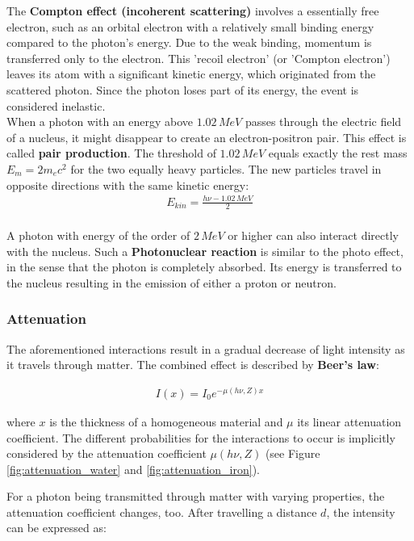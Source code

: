 The \textbf{Compton effect (incoherent scattering)} involves a essentially free electron, such as an orbital electron with a relatively small binding energy compared to the photon's energy.
Due to the weak binding, momentum is transferred only to the electron.
This 'recoil electron' (or 'Compton electron') leaves its atom with a significant kinetic energy, which originated from the scattered photon.
Since the photon loses part of its energy, the event is considered inelastic. \\

When a photon with an energy above $1.02 \, MeV$ passes through the electric field of a nucleus, it might disappear to create an electron-positron pair.
This effect is called \textbf{pair production}.
The threshold of $1.02 \, MeV$ equals exactly the rest mass $E_m = 2m_ec^2$ for the two equally heavy particles.
The new particles travel in opposite directions with the same kinetic energy:
\begin{align}
 E_{kin} = \frac{h\nu - 1.02 \, MeV}{2}
\end{align} \\

A photon with energy of the order of $2 \, MeV$ or higher can also interact directly with the nucleus.
Such a \textbf{Photonuclear reaction} is similar to the photo effect, in the sense that the photon is completely absorbed.
Its energy is transferred to the nucleus resulting in the emission of either a proton or neutron. \cite{Podgorsak, Maidment2014}\\

\subsubsection{Attenuation}
The aforementioned interactions result in a gradual decrease of light intensity as it travels through matter.
The combined effect is described by \textbf{Beer's law}:

\begin{align}
I(x) = I_0 e^{-\mu(h\nu,Z)x}
\end{align}

where $x$ is the thickness of a homogeneous material and $\mu$ its linear attenuation coefficient.
The different probabilities for the interactions to occur is implicitly considered by the attenuation coefficient $\mu(h\nu,Z)$ (see Figure \ref{fig:attenuation_water} and \ref{fig:attenuation_iron}).

For a photon being transmitted through matter with varying properties, the attenuation coefficient changes, too.
After travelling a distance $d$, the intensity can be expressed as:

